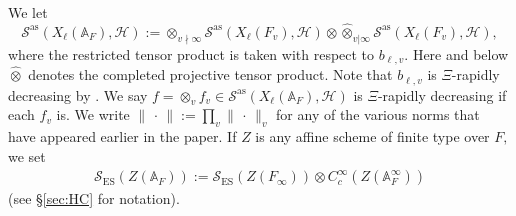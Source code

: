 \documentclass[12pt]{amsart}
\theoremstyle{remark}
\numberwithin{equation}{section}
\newcommand{\A}{\mathbb{A}}
\theoremstyle{definition}
\numberwithin{equation}{subsection}
\newcommand{\norm}[1]{\lVert#1\rVert}
\begin{document}
We let 
$$
\mathcal{S}^{\mathrm{as}}(X_{\ell}(\A_F),\mathcal{H}):=\otimes_{v \nmid \infty}\mathcal{S}^{\mathrm{as}}(X_{\ell}(F_v),\mathcal{H}) \otimes \widehat{\otimes}_{v|\infty}\mathcal{S}^{\mathrm{as}}(X_{\ell}(F_v),\mathcal{H}),
$$
where the restricted tensor product is taken with respect to $b_{\ell,v}.$ Here and below $\widehat{\otimes}$ denotes the  completed projective tensor product. Note that $b_{\ell,v}$ is $\Xi$-rapidly decreasing by . We say $f=\otimes_v f_v\in \mathcal{S}^{\mathrm{as}}(X_{\ell}(\A_F),\mathcal{H})$ is $\Xi$-rapidly decreasing if each $f_v$ is.   We write $\norm{\,\cdot\,}:=\prod_{v}\norm{\,\cdot\,}_v$ for any of the various norms that have appeared earlier in the paper.  If $Z$ is any affine scheme of finite type over $F,$ we set
\begin{align*}
\mathcal{S}_{\mathrm{ES}}(Z(\A_F)):=\mathcal{S}_{\mathrm{ES}}(Z(F_\infty))\otimes C_c^\infty(Z(\A_F^\infty)) 
\end{align*}
(see \S \ref{sec:HC} for notation).
\end{document}
